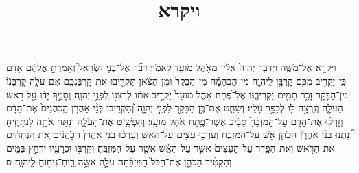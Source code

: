 \documentclass{openreader}
\title{ויקרא}
\date{}
\begin{document}
\maketitle
\raggedbottom 
\fontsize{16pt}{24pt}\selectfont


וַיִּקְרָ֖א אֶל־מֹשֶׁ֑ה וַיְדַבֵּ֤ר יְהוָה֙ אֵלָ֔יו מֵאֹ֥הֶל מֹועֵ֖ד לֵאמֹֽר׃ 
דַּבֵּ֞ר אֶל־בְּנֵ֤י יִשְׂרָאֵל֙ וְאָמַרְתָּ֣ אֲלֵהֶ֔ם אָדָ֗ם כִּֽי־יַקְרִ֥יב מִכֶּ֛ם קָרְבָּ֖ן לַֽיהוָ֑ה מִן־הַבְּהֵמָ֗ה מִן־הַבָּקָר֙ וּמִן־הַצֹּ֔אן תַּקְרִ֖יבוּ אֶת־קָרְבַּנְכֶֽם׃ 
אִם־עֹלָ֤ה קָרְבָּנֹו֙ מִן־הַבָּקָ֔ר זָכָ֥ר תָּמִ֖ים יַקְרִיבֶ֑נּוּ אֶל־פֶּ֝תַח אֹ֤הֶל מֹועֵד֙ יַקְרִ֣יב אֹתֹ֔ו לִרְצֹנֹ֖ו לִפְנֵ֥י יְהוָֽה׃ 
וְסָמַ֣ךְ יָדֹ֔ו עַ֖ל רֹ֣אשׁ הָעֹלָ֑ה וְנִרְצָ֥ה לֹ֖ו לְכַפֵּ֥ר עָלָֽיו׃ 
וְשָׁחַ֛ט אֶת־בֶּ֥ן הַבָּקָ֖ר לִפְנֵ֣י יְהוָ֑ה וְ֠הִקְרִיבוּ בְּנֵ֨י אַהֲרֹ֤ן הַֽכֹּֽהֲנִים֙ אֶת־הַדָּ֔ם וְזָרְק֨וּ אֶת־הַדָּ֤ם עַל־הַמִּזְבֵּ֨חַ֙ סָבִ֔יב אֲשֶׁר־פֶּ֖תַח אֹ֥הֶל מֹועֵֽד׃ 
וְהִפְשִׁ֖יט אֶת־הָעֹלָ֑ה וְנִתַּ֥ח אֹתָ֖הּ לִנְתָחֶֽיהָ׃ 
וְ֠נָתְנוּ בְּנֵ֨י אַהֲרֹ֧ן הַכֹּהֵ֛ן אֵ֖שׁ עַל־הַמִּזְבֵּ֑חַ וְעָרְכ֥וּ עֵצִ֖ים עַל־הָאֵֽשׁ׃ 
וְעָרְכ֗וּ בְּנֵ֤י אַהֲרֹן֙ הַכֹּ֣הֲנִ֔ים אֵ֚ת הַנְּתָחִ֔ים אֶת־הָרֹ֖אשׁ וְאֶת־הַפָּ֑דֶר עַל־הָעֵצִים֙ אֲשֶׁ֣ר עַל־הָאֵ֔שׁ אֲשֶׁ֖ר עַל־הַמִּזְבֵּֽחַ׃ 
וְקִרְבֹּ֥ו וּכְרָעָ֖יו יִרְחַ֣ץ בַּמָּ֑יִם וְהִקְטִ֨יר הַכֹּהֵ֤ן אֶת־הַכֹּל֙ הַמִּזְבֵּ֔חָה עֹלָ֛ה אִשֵּׁ֥ה רֵֽיחַ־נִיחֹ֖וחַ לַֽיהוָֽה׃ ס 
\end{document}
